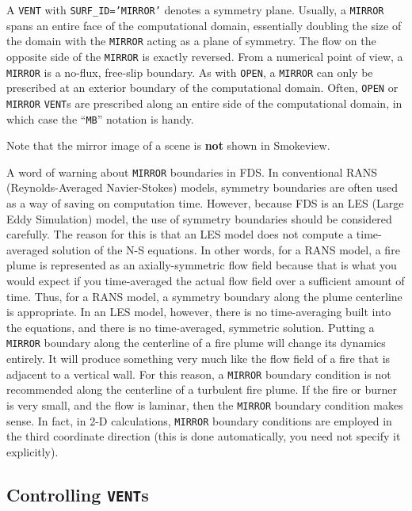 \documentclass[11pt]{book}
\newcommand{\ct}{\tt\small}
\begin{document}
A {\ct VENT} with {\ct SURF\_ID='MIRROR'} denotes a symmetry plane.
Usually, a {\ct MIRROR} spans an entire face of the computational
domain, essentially doubling the size of the domain with the {\ct MIRROR}
acting as a plane of symmetry. The flow on the opposite side of the
{\ct MIRROR} is exactly reversed. From a numerical point of view,
a {\ct MIRROR} is a no-flux, free-slip boundary.
As with {\ct OPEN}, a {\ct MIRROR} can only be prescribed at an
exterior boundary of the computational domain.
Often, {\ct OPEN} or {\ct MIRROR} {\ct VENT}s are prescribed along an
entire side of the computational domain, in which case the ``{\ct MB}''
notation is handy.

\begin{warning}
\noindent
Note that the mirror image of a scene is {\bf not} shown in Smokeview.
\end{warning}

\noindent
A word of warning about {\ct MIRROR} boundaries in FDS. In conventional RANS (Reynolds-Averaged Navier-Stokes) models, symmetry boundaries are often used as a way of
saving on computation time. However, because FDS is an LES (Large Eddy Simulation) model, the use of symmetry boundaries should be considered carefully. The reason for this is that
an LES model does not compute a time-averaged solution of the N-S equations. In other words, for a RANS model, a fire plume is represented as an axially-symmetric flow field because
that is what you would expect if you time-averaged the actual flow field over a sufficient amount of time. Thus, for a RANS model, a symmetry boundary along the plume centerline is
appropriate. In an LES model, however, there is no time-averaging built into the equations, and there is no time-averaged, symmetric solution. Putting a {\ct MIRROR} boundary
along the centerline of a fire plume will change its dynamics entirely. It will produce something very much like the flow field of a fire that is adjacent to a vertical wall. For this
reason, a {\ct MIRROR} boundary condition is not recommended along the centerline of a turbulent fire plume. If the fire or burner is very small, and the flow is laminar, then the
{\ct MIRROR} boundary condition makes sense. In fact, in 2-D calculations, {\ct MIRROR} boundary conditions are employed in the third coordinate direction (this is done automatically, you
need not specify it explicitly).

\subsection{\texorpdfstring{{Controlling {\tt VENT}s}}{Controlling VENTs}}
\end{document}
